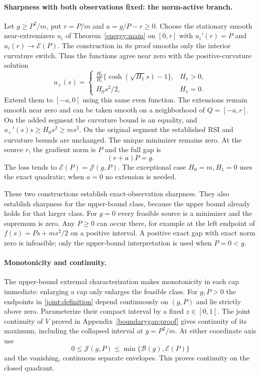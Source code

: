 \paragraph{Sharpness with both observations fixed: the norm-active branch.}
Let $g\ge P^2/m$, put $r=P/m$ and $a=g/P-r\ge0$.
Choose the stationary smooth near-extremizers $u_i$ of
Theorem~\ref{energy:main} on $[0,r]$ with
$u_i'(r)=P$ and $u_i(r)\to\mathcal E(P)$.
The construction in its proof smooths only the interior curvature
switch. Thus the functions agree near zero with the positive-curvature
solution
\[
 u_+(s)=
 \begin{cases}
 \displaystyle\frac{H_0}{H_1}
       \{\cosh(\sqrt{H_1}s)-1\},&H_1>0,\\[1mm]
 H_0s^2/2,&H_1=0.
 \end{cases}
\]
Extend them to $[-a,0]$ using this same even function.
The extensions remain smooth near zero and can be taken smooth
on a neighborhood of $Q=[-a,r]$.
On the added segment the curvature bound is an equality, and
$u_+'(s)s\ge H_0s^2\ge ms^2$.
On the original segment the established RSI and curvature bounds
are unchanged. The unique minimizer remains zero.
At the source $r$, the gradient norm is $P$ and the full gap is
\[
 (r+a)P=g.
\]
The loss tends to $\mathcal E(P)=\mathcal J(g,P)$.
The exceptional case $H_0=m,H_1=0$ uses the exact quadratic;
when $a=0$ no extension is needed.

These two constructions establish exact-observation sharpness.
They also establish sharpness for the upper-bound class, because
the upper bound already holds for that larger class.
For $g=0$ every feasible source is a minimizer and the supremum
is zero. Any $P\ge0$ can occur there, for example at the left
endpoint of $f(s)=Ps+ms^2/2$ on a positive interval.
A positive exact gap with exact norm zero is infeasible; only
the upper-bound interpretation is used when $P=0<g$.

\paragraph{Monotonicity and continuity.}
The upper-bound extremal characterization makes monotonicity in
each cap immediate: enlarging a cap only enlarges the feasible
class. For $g,P>0$ the endpoints in \eqref{joint:definition}
depend continuously on $(g,P)$ and lie strictly above zero.
Parameterize their compact interval by a fixed $z\in[0,1]$.
The joint continuity of $V$ proved in
Appendix~\ref{boundarygap:proof} gives continuity of its maximum,
including the collapsed interval at $g=P^2/m$.
At either coordinate axis use
\[
 0\le\mathcal J(g,P)\le\min\{\mathcal B(g),\mathcal E(P)\}
\]
and the vanishing, continuous separate envelopes. This proves
continuity on the closed quadrant.

